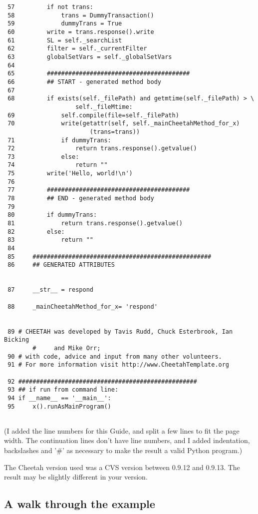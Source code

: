 \begin{verbatim}
 57	        if not trans:
 58	            trans = DummyTransaction()
 59	            dummyTrans = True
 60	        write = trans.response().write
 61	        SL = self._searchList
 62	        filter = self._currentFilter
 63	        globalSetVars = self._globalSetVars
 64	        
 65	        ########################################
 66	        ## START - generated method body
 67	        
 68	        if exists(self._filePath) and getmtime(self._filePath) > \
                    self._fileMtime:
 69	            self.compile(file=self._filePath)
 70	            write(getattr(self, self._mainCheetahMethod_for_x)
                        (trans=trans))
 71	            if dummyTrans:
 72	                return trans.response().getvalue()
 73	            else:
 74	                return ""
 75	        write('Hello, world!\n')
 76	        
 77	        ########################################
 78	        ## END - generated method body
 79	        
 80	        if dummyTrans:
 81	            return trans.response().getvalue()
 82	        else:
 83	            return ""
 84	        
 85	    ##################################################
 86	    ## GENERATED ATTRIBUTES
    
    
 87	    __str__ = respond
    
 88	    _mainCheetahMethod_for_x= 'respond'
    
    
 89	# CHEETAH was developed by Tavis Rudd, Chuck Esterbrook, Ian Bicking 
        #     and Mike Orr;
 90	# with code, advice and input from many other volunteers.
 91	# For more information visit http://www.CheetahTemplate.org
    
 92	##################################################
 93	## if run from command line:
 94	if __name__ == '__main__':
 95	    x().runAsMainProgram()
    
\end{verbatim}

(I added the line numbers for this Guide, and split a few lines to fit the
page width.  The continuation lines don't have line numbers, and I added
indentation, backslashes and '\#' as necessary to make the result a valid
Python program.)

The Cheetah version used was a CVS version between 0.9.12 and 0.9.13.  The
result may be slightly different in your version.

\subsection{A walk through the example}
\label{pyModules.walk}

